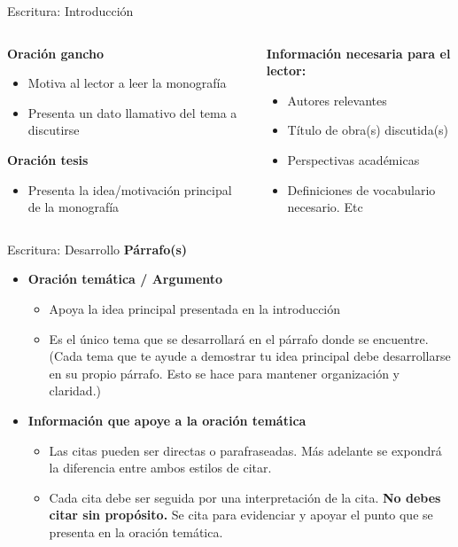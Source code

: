 \documentclass[
11pt, %
]{beamer}
\begin{document}
\begin{frame}{Escritura: Introducción}

	\begin{columns}[c]
		\begin{column}{0.45\textwidth}
			\textbf{Oración gancho}
			\begin{itemize}
				\item Motiva al lector a leer la monografía
				\item Presenta un dato llamativo del tema a discutirse
			\end{itemize}
			\textbf{Oración tesis}
			\begin{itemize}
				\item Presenta la idea/motivación principal de la monografía
			\end{itemize}
		\end{column}
		\begin{column}{0.5\textwidth}
			\textbf{Información necesaria para el lector:}
			\begin{itemize}
				\item Autores relevantes
				\item Título de obra(s) discutida(s)
				\item Perspectivas académicas
				\item Definiciones de vocabulario necesario. Etc
			\end{itemize}
		\end{column}
	\end{columns}
\end{frame}

\begin{frame}{Escritura: Desarrollo}
	\textbf{Párrafo(s)}
	\begin{itemize}
		\item 	\textbf{Oración temática / Argumento}
		      \begin{itemize}
			      \item Apoya la idea principal presentada en la introducción
			      \item Es el único tema que se desarrollará en el párrafo donde se encuentre.(Cada tema que te ayude a demostrar tu idea principal debe desarrollarse en su propio párrafo. Esto se hace para mantener organización y claridad.)
		      \end{itemize}
		\item \textbf{Información que apoye a la oración temática}

		      \begin{itemize}
			      \item Las citas pueden ser directas o parafraseadas. Más adelante se expondrá la diferencia entre ambos estilos de citar.
			      \item Cada cita debe ser seguida por una interpretación de la cita. \textbf{No debes citar sin propósito.} Se cita para evidenciar y apoyar el punto que se presenta en la oración temática.
		      \end{itemize}
	\end{itemize}

\end{frame}
\end{document}
